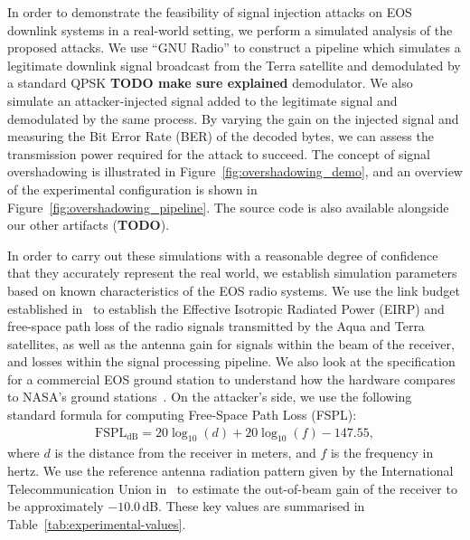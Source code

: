 In order to demonstrate the feasibility of signal injection attacks on EOS downlink systems in a real-world setting, we perform a simulated analysis of the proposed attacks.
We use ``GNU Radio'' to construct a pipeline which simulates a legitimate downlink signal broadcast from the Terra satellite and demodulated by a standard QPSK \textbf{TODO make sure explained} demodulator.
We also simulate an attacker-injected signal added to the legitimate signal and demodulated by the same process.
By varying the gain on the injected signal and measuring the Bit Error Rate (BER) of the decoded bytes, we can assess the transmission power required for the attack to succeed.
The concept of signal overshadowing is illustrated in Figure~\ref{fig:overshadowing_demo}, and an overview of the experimental configuration is shown in Figure~\ref{fig:overshadowing_pipeline}.
The source code is also available alongside our other artifacts (\textbf{TODO}).

In order to carry out these simulations with a reasonable degree of confidence that they accurately represent the real world, we establish simulation parameters based on known characteristics of the EOS radio systems.
We use the link budget established in~\cite{quinnNew2003} to establish the Effective Isotropic Radiated Power (EIRP) and free-space path loss of the radio signals transmitted by the Aqua and Terra satellites, as well as the antenna gain for signals within the beam of the receiver, and losses within the signal processing pipeline.
We also look at the specification for a commercial EOS ground station to understand how the hardware compares to NASA's ground stations~\cite{dartcomsystemsltdXBand2021}.
On the attacker's side, we use the following standard formula for computing Free-Space Path Loss (FSPL):
\begin{align}
    \text{FSPL}_{\text{dB}} = 20\log_{10}(d) + 20\log_{10}(f) - 147.55, \label{eq:fspl}
\end{align}
where $d$ is the distance from the receiver in meters, and $f$ is the frequency in hertz.
We use the reference antenna radiation pattern given by the International Telecommunication Union in~\cite{itu2022antenna} to estimate the out-of-beam gain of the receiver to be approximately $-10.0$\,dB.
These key values are summarised in Table~\ref{tab:experimental-values}.

